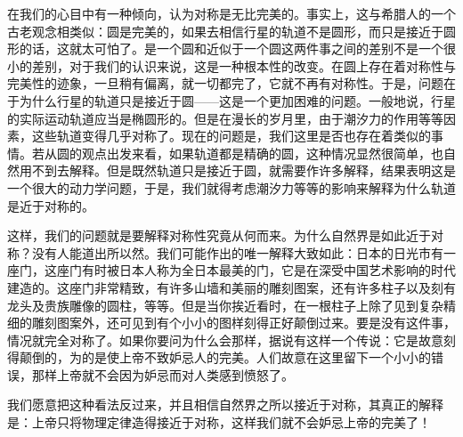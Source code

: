 在我们的心目中有一种倾向，认为对称是无比完美的。事实上，这与希腊人的一个古老观念相类似：圆是完美的，如果去相信行星的轨道不是圆形，而只是接近于圆形的话，这就太可怕了。是一个圆和近似于一个圆这两件事之间的差别不是一个很小的差别，对于我们的认识来说，这是一种根本性的改变。在圆上存在着对称性与完美性的迹象，一旦稍有偏离，就一切都完了，它就不再有对称性。于是，问题在于为什么行星的轨道只是接近于圆——这是一个更加困难的问题。一般地说，行星的实际运动轨道应当是椭圆形的。但是在漫长的岁月里，由于潮汐力的作用等等因素，这些轨道变得几乎对称了。现在的问题是，我们这里是否也存在着类似的事情。若从圆的观点出发来看，如果轨道都是精确的圆，这种情况显然很简单，也自然用不到去解释。但是既然轨道只是接近于圆，就需要作许多解释，结果表明这是一个很大的动力学问题，于是，我们就得考虑潮汐力等等的影响来解释为什么轨道是近于对称的。

这样，我们的问题就是要解释对称性究竟从何而来。为什么自然界是如此近于对称？没有人能道出所以然。我们可能作出的唯一解释大致如此：日本的日光市有一座门，这座门有时被日本人称为全日本最美的门，它是在深受中国艺术影响的时代建造的。这座门非常精致，有许多山墙和美丽的雕刻图案，还有许多柱子以及刻有龙头及贵族雕像的圆柱，等等。但是当你挨近看时，在一根柱子上除了见到复杂精细的雕刻图案外，还可见到有个小小的图样刻得正好颠倒过来。要是没有这件事，情况就完全对称了。如果你要问为什么会那样，据说有这样一个传说：它是故意刻得颠倒的，为的是使上帝不致妒忌人的完美。人们故意在这里留下一个小小的错误，那样上帝就不会因为妒忌而对人类感到愤怒了。

我们愿意把这种看法反过来，并且相信自然界之所以接近于对称，其真正的解释是：上帝只将物理定律造得接近于对称，这样我们就不会妒忌上帝的完美了！